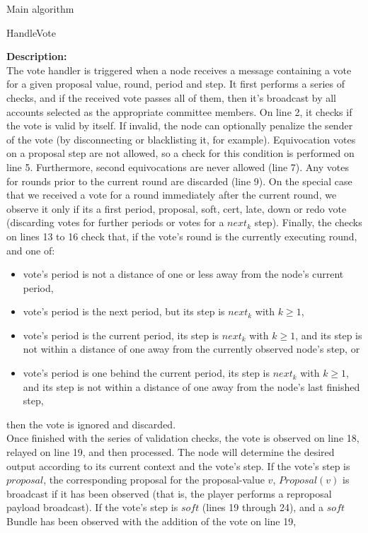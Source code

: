 \documentclass[10pt,a4paper]{article}
\begin{document}
\begin{section}{Main algorithm}
\begin{subsection}{HandleVote}
    
    \noindent \textbf{Description:}\\
The vote handler is triggered when a node receives a message containing a vote for a given proposal value, round, period and step.
It first performs a series of checks, and if the received vote passes all of them, then it's broadcast by all accounts selected
as the appropriate committee members.
On line 2, it checks if the vote is valid by itself. If invalid, the node can optionally penalize the sender of the vote
(by disconnecting or blacklisting it, for example).
Equivocation votes on a proposal step are not allowed, so a check for this condition is performed on line 5.
Furthermore, second equivocations are never allowed (line 7).
Any votes for rounds prior to the current round are discarded (line 9).
On the special case that we received a vote for a round immediately after the current round, we observe it only if its a first period,
proposal, soft, cert, late, down or redo vote (discarding votes for further periods or votes for a $next_k$ step).
Finally, the checks on lines 13 to 16 check that, if the vote's round is the currently executing round, and one of:
\begin{itemize}
    \item vote's period is not a distance of one or less away from the node's current period,
    \item vote's period is the next period, but its step is $next_{k}$ with $k \geq 1$,
    \item vote's period is the current period, its step is $next_{k}$ with $k \geq 1$, 
and its step is not within a distance of one away from the currently observed node's step, or
    \item vote's period is one behind the current period, its step is $next_{k}$ with $k \geq 1$, and
its step is not within a distance of one away from the node's last finished step,
\end{itemize}
then the vote is ignored and discarded. \\
Once finished with the series of validation checks, the vote is observed on line 18, relayed on line 19, and then processed.
The node will determine the desired output according to its current context and the vote's step.
If the vote's step is $proposal$, the corresponding proposal for the proposal-value $v$, $Proposal(v)$ is broadcast if it has been observed 
(that is, the player performs a reproposal payload broadcast).
If the vote's step is $soft$ (lines 19 through 24), and a $soft$ Bundle has been observed with the addition of the vote on line 19,

\end{subsection}
\end{section}
\end{document}
